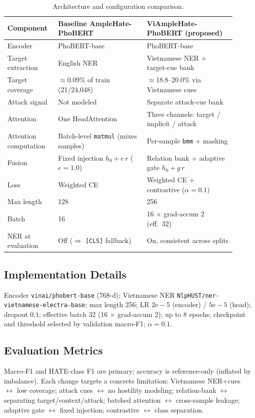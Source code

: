 \documentclass[11pt]{article}
\begin{document}
\begin{table}[t]
  \centering
  \small
  \begin{tabular}{p{0.20\linewidth} p{0.36\linewidth} p{0.36\linewidth}}
    \toprule
    \textbf{Component} & \textbf{Baseline AmpleHate-PhoBERT} & \textbf{ViAmpleHate-PhoBERT (proposed)} \\
    \midrule
    Encoder & PhoBERT-base & PhoBERT-base \\
    Target extraction & English NER & Vietnamese NER + target-cue bank \\
    Target coverage & $\approx$0.09\% of train (21/24{,}048) & $\approx$18.8--20.0\% via Vietnamese cues \\
    Attack signal & Not modeled & Separate attack-cue bank \\
    Attention & One HeadAttention & Three channels: target / implicit / attack \\
    Attention computation & Batch-level \texttt{matmul} (mixes samples) & Per-sample \texttt{bmm} + masking \\
    Fusion & Fixed injection $h_0+e\,r$ ($e{=}1.0$) & Relation bank + adaptive gate $h_0+g\,r$ \\
    Loss & Weighted CE & Weighted CE + contrastive ($\alpha{=}0.1$) \\
    Max length & 128 & 256 \\
    Batch & 16 & 16 $\times$ grad-accum 2 (eff.\ 32) \\
    NER at evaluation & Off ($\Rightarrow$ \texttt{[CLS]} fallback) & On, consistent across splits \\
    \bottomrule
  \end{tabular}
  \caption{Architecture and configuration comparison.}
  \label{tab:arch}
\end{table}

\subsection{Implementation Details}
Encoder \texttt{vinai/phobert-base} (768-d); Vietnamese NER \texttt{NlpHUST/ner-vietnamese-electra-base}; max length 256; LR $2\mathrm{e}{-}5$ (encoder) / $5\mathrm{e}{-}5$ (head); dropout $0.1$; effective batch 32 (16 $\times$ grad-accum 2); up to 8 epochs; checkpoint and threshold selected by validation macro-F1; $\alpha=0.1$.

\subsection{Evaluation Metrics}
Macro-F1 and HATE-class F1 are primary; accuracy is reference-only (inflated by imbalance). Each change targets a concrete limitation: Vietnamese NER+cues $\leftrightarrow$ low coverage; attack cues $\leftrightarrow$ no hostility modeling; relation-bank $\leftrightarrow$ separating target/context/attack; batched attention $\leftrightarrow$ cross-sample leakage; adaptive gate $\leftrightarrow$ fixed injection; contrastive $\leftrightarrow$ class separation.
\end{document}
